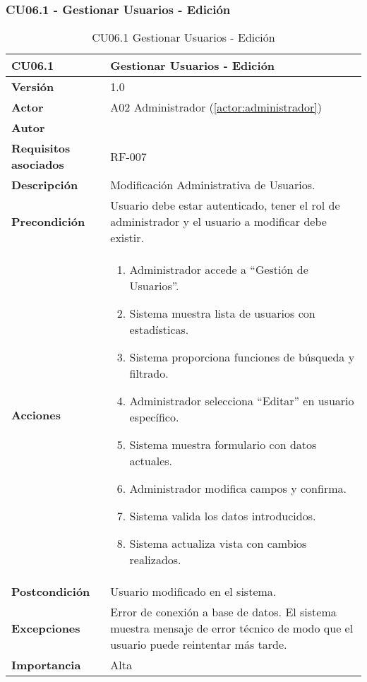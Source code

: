 \subsubsection{CU06.1 - Gestionar Usuarios - Edición}

\begin{table}[H]
	\centering
	\begin{tabularx}{\linewidth}{ p{} p{} }
		\toprule
		\textbf{CU06.1}    & \textbf{Gestionar Usuarios - Edición} \\
		\toprule
		\textbf{Versión}              & 1.0    \\
		\textbf{Actor}                & A02 Administrador (\ref{actor:administrador}) \\
		\textbf{Autor}                & \nombre \\
		\textbf{Requisitos asociados} & RF-007 \\
		\textbf{Descripción}          & Modificación Administrativa de Usuarios. \\
		\textbf{Precondición}         & Usuario debe estar autenticado, tener el rol de administrador y el usuario a modificar debe existir. \\
		\textbf{Acciones}             &
		\begin{enumerate}
			\def\labelenumi{\arabic{enumi}.}
			\tightlist
			\item Administrador accede a ``Gestión de Usuarios''.
            \item Sistema muestra lista de usuarios con estadísticas.
            \item Sistema proporciona funciones de búsqueda y filtrado.
            \item Administrador selecciona ``Editar'' en usuario específico.
 	    \item Sistema muestra formulario con datos actuales.
            \item Administrador modifica campos y confirma.
            \item Sistema valida los datos introducidos.
            \item Sistema actualiza vista con cambios realizados.
		\end{enumerate}\\
		\textbf{Postcondición}        & Usuario modificado en el sistema.\\
		\textbf{Excepciones}          & Error de conexión a base de datos. El sistema muestra mensaje de error técnico de modo que el usuario puede reintentar más tarde.\\
		\textbf{Importancia}          & Alta \\
		\bottomrule
	\end{tabularx}
	\caption{CU06.1 Gestionar Usuarios - Edición}
	\label{cu:gestionar-usuarios-edicion}
\end{table}

